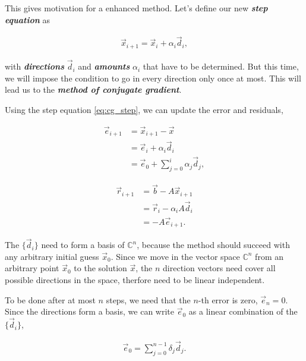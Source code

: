 \documentclass{article}
\theoremstyle{plain} %
\theoremstyle{remark} %
\def\df#1{\textbf{\textit{#1}}}
\numberwithin{equation}{section}
\begin{document}
This gives motivation for a enhanced method. Let's define our new \df{step equation} as

\begin{align}
    \vec{x}_{i+1} = \vec{x}_i + \alpha_i \vec{d}_i, \label{eq:cg_step}
\end{align}

with \df{directions} $\vec{d}_i$ and \df{amounts} $\alpha_i$ that have to be determined. But this time, we will impose the condition to go in every direction only once at most. This will lead us to the \df{method of conjugate gradient}.

Using the step equation \eqref{eq:cg_step}, we can update the error and residuals,

\begin{subequations}
    \begin{align}
        \vec{e}_{i+1} &= \vec{x}_{i+1} - \vec{x} \\
                      &= \vec{e}_{i} + \alpha_i \vec{d}_{i} \label{eq:cg_error1} \\
                      &= \vec{e}_{0} + \sum_{j=0}^{i} \alpha_j \vec{d}_{j}, \label{eq:cg_error2}
    \end{align}
\end{subequations}

\begin{subequations}
    \begin{align}
        \vec{r}_{i+1} &= \vec{b} - A \vec{x}_{i+1} \label{eq:residual_exact} \\
                      &= \vec{r}_{i} - \alpha_i A \vec{d}_{i} \label{eq:residual_recursive} \\
                      &= - A \vec{e}_{i+1}. \label{eq:cg_error2}
    \end{align}
\end{subequations}

The $\{\vec{d}_i\}$ need to form a basis of $\mathbb{C}^n$, because the method should succeed with any arbitrary initial guess $\vec{x}_0$. Since we move in the vector space $\mathbb{C}^n$ from an arbitrary point $\vec{x}_0$ to the solution $\vec{x}$, the $n$ direction vectors need cover all possible directions in the space, therfore need to be linear independent.

To be done after at most $n$ steps, we need that the $n$-th error is zero, $\vec{e}_n = 0$. Since the directions form a basis, we can write $\vec{e}_0$ as a linear combination of the $\{\vec{d}_i\}$,

\begin{align*}
    \vec{e}_{0} = \sum_{j=0}^{n-1} \delta_j \vec{d}_j.
\end{align*}
\end{document}
